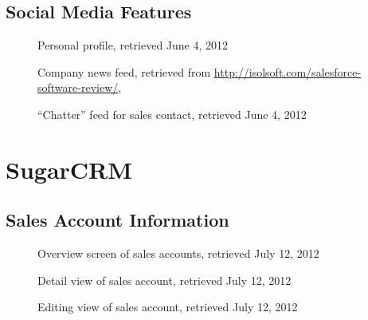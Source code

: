 \FloatBarrier
\subsection{Social Media Features}
\begin{figure}[htbp]
	\centering
	\caption[salesforce.com: Personal profile]{Personal profile, retrieved June 4, 2012}
\end{figure}

\begin{figure}[htbp]
	\centering
	\caption[salesforce.com: Company news feed]{Company news feed, retrieved from \url{http://isolsoft.com/salesforce-software-review/}, \downloadDate}
\end{figure}

\begin{figure}[htbp]
	\centering
	\caption[salesforce.com: ``Chatter'' feed for sales contact]{``Chatter'' feed for sales contact, retrieved June 4, 2012}
\end{figure}

\FloatBarrier %
\section{SugarCRM}
\label{appsec:sugarcrm}

\FloatBarrier
\subsection{Sales Account Information}
\begin{figure}[htbp]
	\centering
	\caption[SugarCRM: Overview screen of sales accounts]{Overview screen of sales accounts, retrieved July 12, 2012}
\end{figure}

\begin{figure}[htbp]
	\centering
	\caption[SugarCRM: Detail view of sales account]{Detail view of sales account, retrieved July 12, 2012}
\end{figure}

\begin{figure}[htbp]
	\centering
	\caption[SugarCRM: Editing view of sales account]{Editing view of sales account, retrieved July 12, 2012}
\end{figure}

